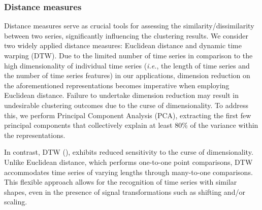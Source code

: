 \documentclass[a4paper,review,12pt,authoryear]{elsarticle}
\begin{document}
\subsubsection{Distance measures}

Distance measures serve as crucial tools for assessing the similarity/dissimilarity between two series, significantly influencing the clustering results.
We consider two widely applied distance measures: Euclidean distance and dynamic time warping (DTW). Due to the limited number of time series in comparison to the high dimensionality of individual time series (\textit{i.e.}, the length of time series and the number of time series features) in our applications, dimension reduction on the aforementioned representations becomes imperative when employing Euclidean distance. Failure to undertake dimension reduction may result in undesirable clustering outcomes due to the curse of dimensionality. To address this, we perform Principal Component Analysis (PCA), extracting the first few principal components that collectively explain at least 80\% of the variance within the representations.

In contrast, DTW (\citealp{sakoeDynamicProgrammingAlgorithm1978}), exhibits reduced sensitivity to the curse of dimensionality. Unlike Euclidean distance, which performs one-to-one point comparisons, DTW accommodates time series of varying lengths through many-to-one comparisons. This flexible approach allows for the recognition of time series with similar shapes, even in the presence of signal transformations such as shifting and/or scaling.
\end{document}
